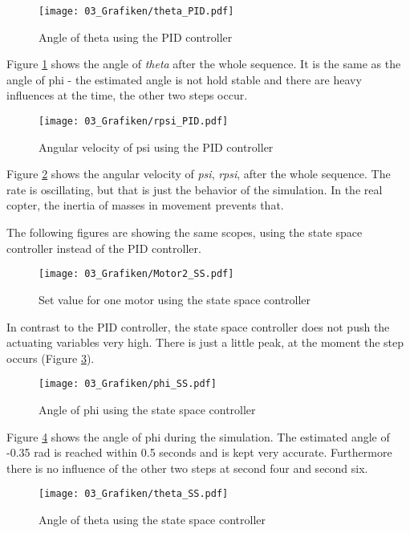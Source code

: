 \begin{figure}
	\centering
		\texttt{[image: 03\_Grafiken/theta\_PID.pdf]}
	\caption{Angle of theta using the PID controller}
	\label{fig:theta_PID}
\end{figure}

Figure \ref{fig:theta_PID} shows the angle of \textit{theta} after the whole sequence. It is the same as the angle of phi - the estimated angle is not hold stable and there are heavy influences at the time, the other two steps occur.

\begin{figure}
	\centering
		\texttt{[image: 03\_Grafiken/rpsi\_PID.pdf]}
	\caption{Angular velocity of psi using the PID controller}
	\label{fig:rpsi_PID}
\end{figure}

Figure \ref{fig:rpsi_PID} shows the angular velocity of \textit{psi}, \textit{rpsi}, after the whole sequence. The rate is oscillating, but that is just the behavior of the simulation. In the real copter, the inertia of masses in movement prevents that.

The following figures are showing the same scopes, using the state space controller instead of the PID controller.

\begin{figure}
	\centering
		\texttt{[image: 03\_Grafiken/Motor2\_SS.pdf]}
	\caption{Set value for one motor using the state space controller}
	\label{fig:Motor2_SS}
\end{figure}

In contrast to the PID controller, the state space controller does not push the actuating variables very high. There is just a little peak, at the moment the step occurs (Figure \ref{fig:Motor2_SS}).

\begin{figure}
	\centering
		\texttt{[image: 03\_Grafiken/phi\_SS.pdf]}
	\caption{Angle of phi using the state space controller}
	\label{fig:phi_SS}
\end{figure}

Figure \ref{fig:phi_SS} shows the angle of phi during the simulation. The estimated angle of -0.35 rad is reached within 0.5 seconds and is kept very accurate. Furthermore there is no influence of the other two steps at second four and second six.

\begin{figure}
	\centering
		\texttt{[image: 03\_Grafiken/theta\_SS.pdf]}
	\caption{Angle of theta using the state space controller}
	\label{fig:theta_SS}
\end{figure}

